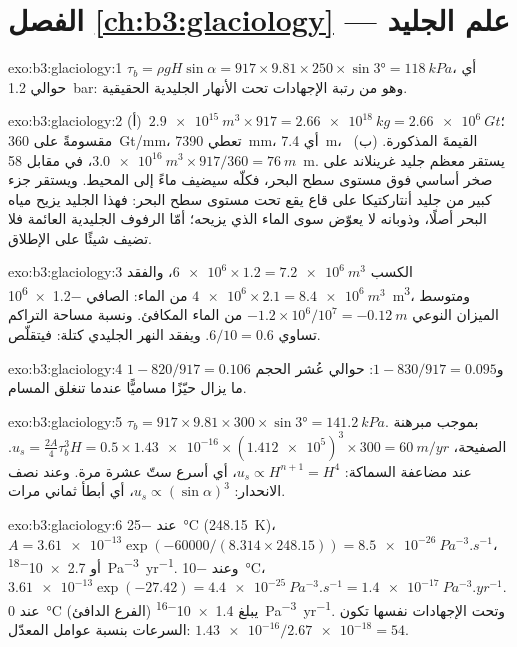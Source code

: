 \section*{الفصل \ref{ch:b3:glaciology} --- علم الجليد}

\begin{solution}{exo:b3:glaciology:1}
$\tau_b = \rho gH\sin\alpha = 917\times9.81\times250\times\sin\ang{3} =
\qty{118}{kPa}$، أي حوالي \qty{1.2}{bar}: وهو من رتبة الإجهادات تحت
الأنهار الجليدية الحقيقية.
\end{solution}

\begin{solution}{exo:b3:glaciology:2}
(أ)~$\qty{2.9e15}{m^3}\times917 = \qty{2.66e18}{kg} = \qty{2.66e6}{Gt}$؛
مقسومةً على \qty{360}{Gt/mm}، تعطي \qty{7390}{mm}، أي \qty{7.4}{m}، القيمةَ المذكورة.
(ب)~$\qty{3.0e16}{m^3}\times917/360 = \qty{76}{m}$، في مقابل \qty{58}{m}.
يستقر معظم جليد غرينلاند على صخر أساسي فوق مستوى سطح البحر، فكلّه
سيضيف ماءً إلى المحيط. ويستقر جزء كبير من جليد أنتاركتيكا على قاع
يقع تحت مستوى سطح البحر: فهذا الجليد يزيح مياه البحر أصلًا، وذوبانه لا يعوّض سوى
الماء الذي يزيحه؛ أمّا الرفوف الجليدية العائمة فلا تضيف شيئًا على الإطلاق.
\end{solution}

\begin{solution}{exo:b3:glaciology:3}
الكسب $\num{6e6}\times1.2 = \qty{7.2e6}{m^3}$، والفقد $\num{4e6}\times2.1 =
\qty{8.4e6}{m^3}$ من الماء: الصافي \qty{-1.2e6}{m^3}، ومتوسط الميزان النوعي
$-1.2\times10^6/10^7 = \qty{-0.12}{m}$ من الماء المكافئ. ونسبة
مساحة التراكم تساوي $6/10 = 0.6$. ويفقد النهر الجليدي كتلة:
فيتقلّص.
\end{solution}

\begin{solution}{exo:b3:glaciology:4}
$1 - 820/917 = \num{0.106}$ و$1 - 830/917 = \num{0.095}$: حوالي عُشر الحجم
ما يزال حيّزًا مساميًّا عندما تنغلق المسام.
\end{solution}

\begin{solution}{exo:b3:glaciology:5}
$\tau_b = 917\times9.81\times300\times\sin\ang{3} = \qty{141.2}{kPa}$. بموجب
مبرهنة الصفيحة، $u_s = \tfrac{2A}{4}\tau_b^3H = 0.5\times\num{1.43e-16}
\times(\num{1.412e5})^3\times300 = \qty{60}{m/yr}$. عند مضاعفة السماكة: $u_s
\propto H^{n+1} = H^4$، أي أسرع ستّ عشرة مرة. وعند نصف الانحدار: $u_s \propto
(\sin\alpha)^3$، أي أبطأ ثماني مرات.
\end{solution}

\begin{solution}{exo:b3:glaciology:6}
عند \qty{-25}{\celsius} (\qty{248.15}{K})، $A = \num{3.61e-13}\exp(-60000/
(8.314\times248.15)) = \qty{8.5e-26}{Pa^{-3}.s^{-1}}$، أو
\qty{2.7e-18}{Pa^{-3}.yr^{-1}}. وعند \qty{-10}{\celsius}، $\num{3.61e-13}
\exp(-27.42) = \qty{4.4e-25}{Pa^{-3}.s^{-1}} = \qty{1.4e-17}{Pa^{-3}.yr^{-1}}$.
عند \qty{0}{\celsius} (الفرع الدافئ) يبلغ \qty{1.4e-16}{Pa^{-3}.yr^{-1}}. وتحت
الإجهادات نفسها تكون السرعات بنسبة عوامل المعدّل:
$\num{1.43e-16}/\num{2.67e-18} = 54$.
\end{solution}

